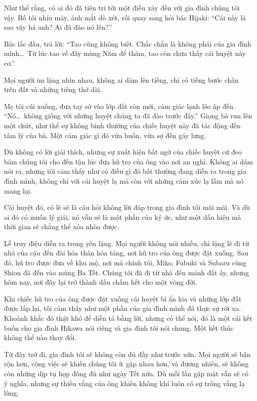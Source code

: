 \documentclass[../main.tex]{subfiles}
\begin{document}
Như thể rằng, có ai đó đã tiên tri tới một điều xảy đến với gia đình chúng tôi vậy. Bố tôi nhíu mày, ánh mắt dò xét, rồi quay sang hỏi bác Hijaki: ``{\color{red}Cái này là sao vậy hả anh? Ai đã đào nó lên?}''

Bác lắc đầu, trả lời: ``{\color{red}Tao cũng không biết. Chắc chắn là không phải của gia đình mình\dots\ Từ lúc tao về đây mùng Năm để thăm, tao còn chưa thấy cái huyệt này cơ.}''

Mọi người im lặng nhìn nhau, không ai dám lên tiếng, chỉ có tiếng bước chân trên đất và những tiếng thở dài.

Mẹ tôi cúi xuống, đưa tay sờ vào lớp đất còn mới, cảm giác lạnh lẽo ập đến. ``Nó\dots\ không giống với những huyệt chúng ta đã đào trước đây.'' Giọng bà run lên một chút, như thể sự không bình thường của chiếc huyệt này đã tác động đến tâm lý của bà. Một cảm giác gì đó vừa buồn, vừa sợ đến gáy lưng.

Dù không có lời giải thích, nhưng sự xuất hiện bất ngờ của chiếc huyệt cứ đeo bám chúng tôi cho đến tận lúc đưa hũ tro của ông vào nơi an nghỉ. Không ai dám nói ra, nhưng tôi cảm thấy như có điều gì đó bất thường đang diễn ra trong gia đình mình, không chỉ với cái huyệt lạ mà còn với những cảm xúc lạ lẫm mà nó mang lại.

Cái huyệt đó, có lẽ sẽ là câu hỏi không lời đáp trong gia đình tôi mãi mãi. Và dù ai đó có muốn lý giải, nó vẫn sẽ là một phần của ký ức, như một dấu hiệu mà thời gian sẽ chẳng thể xóa nhòa được.

Lễ truy điệu diễn ra trong yên lặng. Mọi người không nói nhiều, chỉ lặng lẽ đi từ nhà của cậu đến đài hóa thân hỏa táng, nơi hũ tro của ông được đặt xuống. Sau đó, hũ tro được đưa về khu mộ, nơi mà chính tôi, Miko, Fubuki và Subaru cùng Shion đã đến vào mùng Ba Tết. Chúng tôi đã đi từ nhà đến mảnh đất ấy, nhưng hôm nay, nơi đây lại trở thành dấu chấm hết cho một vòng đời.

Khi chiếc hũ tro của ông được đặt xuống cái huyệt bí ẩn kia và những lớp đất được lấp lại, tôi cảm thấy như một phần của gia đình mình đã thực sự rời xa. Khoảnh khắc đó thật khó để diễn tả bằng lời, nhưng có thể nói, đó là một cái kết buồn cho gia đình Hikawa nói riêng và gia đình tôi nói chung. Một kết thúc không thể nào thay đổi.

Từ đây trở đi, gia đình tôi sẽ không còn đủ đầy như trước nữa. Mọi người sẽ bận rộn hơn, công việc sẽ khiến chúng tôi ít gặp nhau hơn, và đương nhiên, sẽ không còn những dịp tụ họp đông đủ như ngày Tết nữa. Dù mỗi lần gặp mặt vẫn sẽ có ý nghĩa, nhưng sự thiếu vắng của ông khiến không khí luôn có sự trống vắng lạ lùng.
\end{document}
